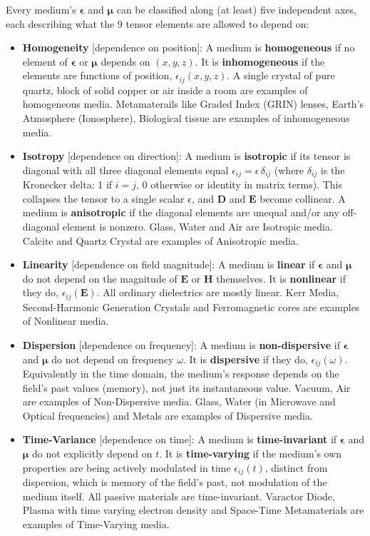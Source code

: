 Every medium's \( \boldsymbol{\epsilon} \) and \( \boldsymbol{\mu} \) can be
classified along (at least) five independent axes, each describing what the
9 tensor elements are allowed to depend on:
\begin{itemize}
  \item \textbf{Homogeneity} [dependence on position]: A medium is
    \textbf{homogeneous} if no element of \( \boldsymbol{\epsilon} \) or
    \( \boldsymbol{\mu} \) depends on \( (x,y,z) \). It is
    \textbf{inhomogeneous} if the elements are functions of position,
    \( \epsilon_{ij}(x,y,z) \). A single crystal of pure quartz, block
    of solid copper or air inside a room are examples of homogeneous media.
    Metamaterails like Graded Index (GRIN) lenses, Earth's Atmosphere
    (Ionosphere), Biological tissue are examples of inhomogeneous media.
  \item \textbf{Isotropy} [dependence on direction]: A medium is
    \textbf{isotropic} if its tensor is diagonal with all three diagonal
    elements equal \( \epsilon_{ij} = \epsilon \, \delta_{ij} \) (where
    \( \delta_{ij} \) is the Kronecker delta: 1 if \( i=j \), 0 otherwise or
    identity in matrix terms). This collapses the tensor to a single scalar
    \( \epsilon \), and \( \mathbf{D} \) and \( \mathbf{E} \) become
    collinear. A medium is \textbf{anisotropic} if the diagonal elements
    are unequal and/or any off-diagonal element is nonzero. Glass, Water
    and Air are Isotropic media. Calcite and Quartz Crystal are examples
    of Anisotropic media.
  \item \textbf{Linearity} [dependence on field magnitude]: A medium is
    \textbf{linear} if \( \boldsymbol{\epsilon} \) and \( \boldsymbol{\mu} \)
    do not depend on the magnitude of \( \mathbf{E} \) or \( \mathbf{H} \)
    themselves. It is \textbf{nonlinear} if they do, \( \epsilon_{ij}(\mathbf{E}) \).
    All ordinary dielectrics are mostly linear. Kerr Media, Second-Harmonic Generation
    Crystals and Ferromagnetic cores are examples of Nonlinear media.
  \item \textbf{Dispersion} [dependence on frequency]: A medium is
    \textbf{non-dispersive} if \( \boldsymbol{\epsilon} \) and
    \( \boldsymbol{\mu} \) do not depend on frequency \( \omega \). It is
    \textbf{dispersive} if they do, \( \epsilon_{ij}(\omega) \). Equivalently in
    the time domain, the medium's response depends on the field's past
    values (memory), not just its instantaneous value. Vacuum, Air
    are examples of Non-Dispersive media. Glass, Water (in Microwave and
    Optical frequencies) and Metals are examples of Dispersive media.
  \item \textbf{Time-Variance} [dependence on time]: A medium is
    \textbf{time-invariant} if \( \boldsymbol{\epsilon} \) and
    \( \boldsymbol{\mu} \) do not explicitly depend on \( t \). It is
    \textbf{time-varying} if the medium's own properties are being actively
    modulated in time \( \epsilon_{ij}(t) \), distinct from dispersion,
    which is memory of the field's past, not modulation of the medium
    itself. All passive materials are time-invariant. Varactor Diode,
    Plasma with time varying electron density and Space-Time Metamaterials
    are examples of Time-Varying media.
\end{itemize}
